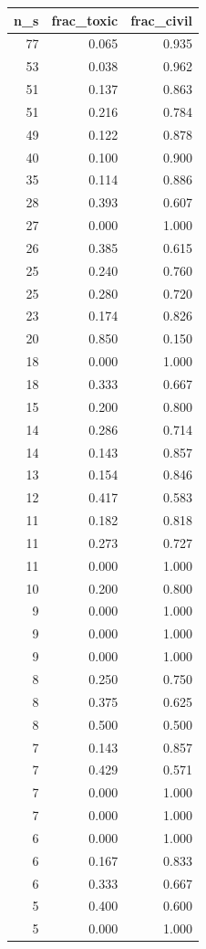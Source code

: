 \begin{tabular}{rrr}
\toprule
n_s & frac_toxic & frac_civil \\
\midrule
77 & 0.065 & 0.935 \\
53 & 0.038 & 0.962 \\
51 & 0.137 & 0.863 \\
51 & 0.216 & 0.784 \\
49 & 0.122 & 0.878 \\
40 & 0.100 & 0.900 \\
35 & 0.114 & 0.886 \\
28 & 0.393 & 0.607 \\
27 & 0.000 & 1.000 \\
26 & 0.385 & 0.615 \\
25 & 0.240 & 0.760 \\
25 & 0.280 & 0.720 \\
23 & 0.174 & 0.826 \\
20 & 0.850 & 0.150 \\
18 & 0.000 & 1.000 \\
18 & 0.333 & 0.667 \\
15 & 0.200 & 0.800 \\
14 & 0.286 & 0.714 \\
14 & 0.143 & 0.857 \\
13 & 0.154 & 0.846 \\
12 & 0.417 & 0.583 \\
11 & 0.182 & 0.818 \\
11 & 0.273 & 0.727 \\
11 & 0.000 & 1.000 \\
10 & 0.200 & 0.800 \\
9 & 0.000 & 1.000 \\
9 & 0.000 & 1.000 \\
9 & 0.000 & 1.000 \\
8 & 0.250 & 0.750 \\
8 & 0.375 & 0.625 \\
8 & 0.500 & 0.500 \\
7 & 0.143 & 0.857 \\
7 & 0.429 & 0.571 \\
7 & 0.000 & 1.000 \\
7 & 0.000 & 1.000 \\
6 & 0.000 & 1.000 \\
6 & 0.167 & 0.833 \\
6 & 0.333 & 0.667 \\
5 & 0.400 & 0.600 \\
5 & 0.000 & 1.000 \\

\end{tabular}
